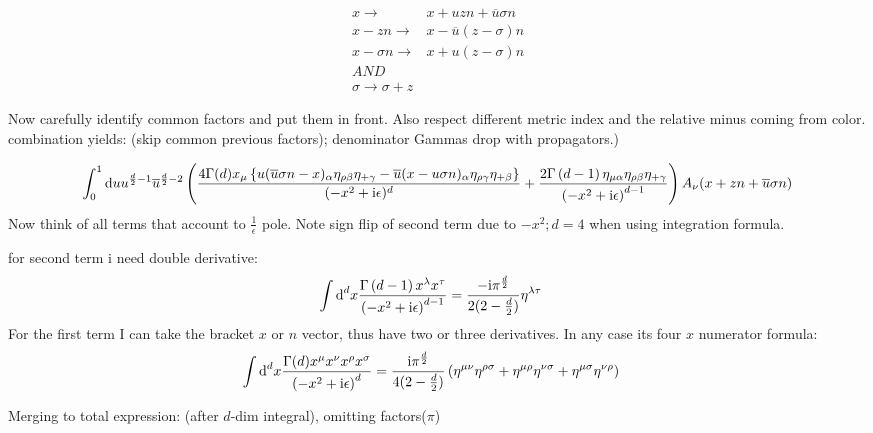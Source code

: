 \begin{align}
x\rightarrow& x + uzn + \overline u \sigma n
\\
x-zn \rightarrow & x - \overline u (z-\sigma)n
\\
x-\sigma n \rightarrow & x +  u (z-\sigma)n
\\
AND
\\
\sigma\rightarrow\sigma + z
\end{align}

Now carefully identify common factors and put them in front. Also respect different metric index and the relative minus coming from color. combination yields: (skip common previous factors); denominator Gammas drop with propagators.)


\begin{align}
\int_{0}^{1} \text{d} u u^{\frac{d}{2}-1} \overline u^{\frac{d}{2}-2} \left( \frac{4\Gamma(d)x_\mu\left\{u (\overline u \sigma n -x )_\alpha \eta_{\rho\beta} \eta_{+\gamma} -\overline u (x - u\sigma n)_\alpha \eta_{\rho \gamma}\eta_{+\beta} \right\}}{(-x^2+\text{i}\epsilon)^{d}} +\frac{2\Gamma\left( d-1 \right) \eta_{\mu \alpha} \eta_{\rho \beta}\eta_{+\gamma} }{\left(-x^2+\text{i} \epsilon\right)^{d-1}}\right)A_{\nu}(x+zn+\overline u \sigma n)
\end{align}
Now think of all terms that account to $\frac{1}{\epsilon}$ pole. Note sign flip of second term due to $-x^2; d=4$ when using integration formula. 

for second term i need double derivative:
\begin{align}
\int \text{d} ^d  x \frac{\Gamma\left( d-1 \right) x^\lambda x^\tau}{\left(-x^2+\text{i} \epsilon\right)^{d-1}}
&=
\frac{-\text{i} \pi^{\frac{d}{2}}}{2(2-\frac{d}{2})}\eta^{\lambda\tau}
\end{align}
For the first term I can take the bracket $x$ or $n$ vector, thus have two or three derivatives. In any case its four $x$ numerator formula:
\begin{align}
\int \text{d} ^d  x \frac{\Gamma(d)x^\mu x^\nu x^\rho x^\sigma}{\left(-x^2+\text{i} \epsilon\right)^{d}}
&=
\frac{\text{i} \pi^{\frac{d}{2}}}{4(2-\frac{d}{2})}\left(\eta^{\mu\nu}\eta^{\rho \sigma} + \eta^{\mu \rho} \eta^{\nu \sigma} +\eta^{\mu \sigma}\eta^{\nu \rho}\right)	
\end{align}

Merging to total expression: (after $d$-dim integral), omitting factors($\pi$)

